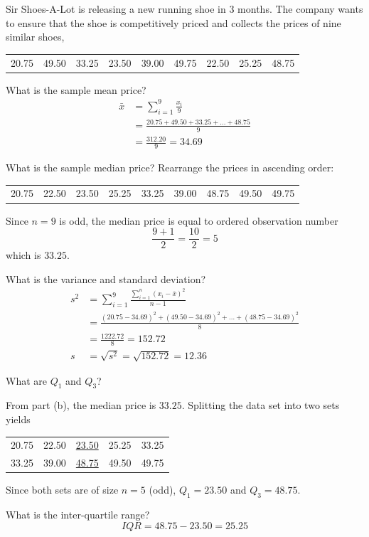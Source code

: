 \begin{example}
Sir Shoes-A-Lot is releasing a new running shoe in 3 months. The company wants to ensure that the shoe is competitively priced and collects the prices of nine similar shoes,
\begin{center}
\begin{tabular}{ccccccccc}
20.75 & 49.50 & 33.25 & 23.50 & 39.00 & 49.75 & 22.50 & 25.25 & 48.75
\end{tabular} 
\end{center}
\begin{benumerate}
\item What is the sample mean price?
\begin{align*}
\bar{x} &= \sum_{i=1}^{9} \frac{x_i}{9} \\
	&= \frac{20.75+49.50+33.25+\hdots+48.75}{9} \\
	&= \frac{312.20}{9} = 34.69
\end{align*}
\item What is the sample median price? 
Rearrange the prices in ascending order:
\begin{center}
\begin{tabular}{ccccccccc}
20.75 & 22.50 & 23.50 & 25.25 & 33.25 & 39.00 & 48.75 & 49.50 & 49.75
\end{tabular} 
\end{center}
Since $n=9$ is odd, the median price is equal to ordered observation number
\[ \frac{9+1}{2}=\frac{10}{2}=5\]
which is $33.25$.
\item What is the variance and standard deviation?
\begin{align*}
s^2 &= \sum_{i=1}^{9} \frac{\sum_{i=1}^{n} (x_i - \bar{x})^2}{n-1} \\
	&= \frac{(20.75-34.69)^2+(49.50-34.69)^2+\hdots+(48.75-34.69)^2}{8} \\
	&= \frac{1222.72}{8} = 152.72 \\
s &= \sqrt{s^2} = \sqrt{152.72} = 12.36
\end{align*}
\item What are $Q_1$ and $Q_3$?

From part (b), the median price is $33.25$. Splitting the data set into two sets yields
\begin{center}
\begin{tabular}{ccccc}
20.75 & 22.50 & \underline{23.50} & 25.25 & 33.25 \\ 
33.25 & 39.00 & \underline{48.75} & 49.50 & 49.75
\end{tabular} 
\end{center}
Since both sets are of size $n=5$ (odd), $Q_1=23.50$ and $Q_3 = 48.75$.
\item What is the inter-quartile range?
\[ IQR = 48.75 - 23.50 = 25.25 \]
\end{benumerate}
\end{example}



